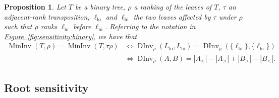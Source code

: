 \documentclass[11pt]{article}
\numberwithin{equation}{section}
\newtheorem{proposition}[theorem]{Proposition}
\theoremstyle{definition}
\theoremstyle{plain}
\newcommand{\expref}[2]{\hyperref[#2]{#1~\ref{#2}}}
\newcommand{\ranking}{\rho}
\newcommand{\transposition}{\tau}
\DeclareMathOperator{\DInv}{DInv}
\DeclareMathOperator{\MInv}{MinInv}
\newcommand{\lo}{\mathrm{lo}}
\newcommand{\hi}{\mathrm{hi}}
\begin{document}
\begin{proposition}\label{prop:sensitivity:criterion}
Let $T$ be a binary tree, $\ranking$ a ranking of the leaves of $T$, $\transposition$ an adjacent-rank transposition, $\ell_\lo$ and $\ell_\hi$ the two leaves affected by $\transposition$ under $\ranking$ such that $\ranking$ ranks $\ell_\lo$ before $\ell_\hi$. Referring to the notation in \expref{Figure}{fig:sensitivity:binary}, we have that 
\begin{align}
\MInv(T,\ranking) = \MInv(T, \transposition \ranking)
&\Leftrightarrow \DInv_\ranking(L_\lo,L_\hi) = \DInv_\ranking(\{\ell_\lo\},\{\ell_\hi\}) \label{eq:criterion:binary:simple} \\
&\Leftrightarrow \DInv_\ranking(A,B) = |A_<| - |A_>| + |B_>| - |B_<|.
\label{eq:criterion:binary:simple:refined}
\end{align}
\end{proposition}

\subsection{Root sensitivity}
\label{sec:sensitivity:root}
\end{document}
